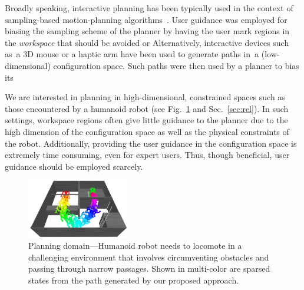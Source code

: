 \documentclass{article}
\begin{document}
Broadly speaking, interactive planning has been typically used in the context of sampling-based motion-planning algorithms~\cite{L06}.
User guidance was employed for biasing the sampling scheme of the planner by having the user mark regions in the \emph{workspace} that should be avoided or 
Alternatively, interactive devices such as~a 3D mouse or a haptic arm have been used to generate paths in~a (low-dimensional) configuration space. Such paths were then used by a planner to bias its 

We are interested in planning in high-dimensional, constrained spaces such as those encountered by a humanoid robot (see Fig.~\ref{fig:robot} and Sec.~\ref{sec:rel}).
In such settings, workspace regions often give little guidance to the planner due to the high dimension of the configuration space as well as the physical constraints of the robot.
Additionally, providing the user guidance in the configuration space is extremely time consuming, even for expert users.
Thus,  though beneficial, user guidance should be employed scarcely.

\begin{figure}[tb]
  \centering
  	\includegraphics[width=0.4\textwidth]{fig/cover.png}
  \caption{
  Planning domain---Humanoid robot needs to locomote in a challenging environment that involves circumventing obstacles and passing through narrow passages. Shown in multi-color are sparsed states from the path generated by our proposed approach.
}
   	\label{fig:robot}
\end{figure}
\end{document}
